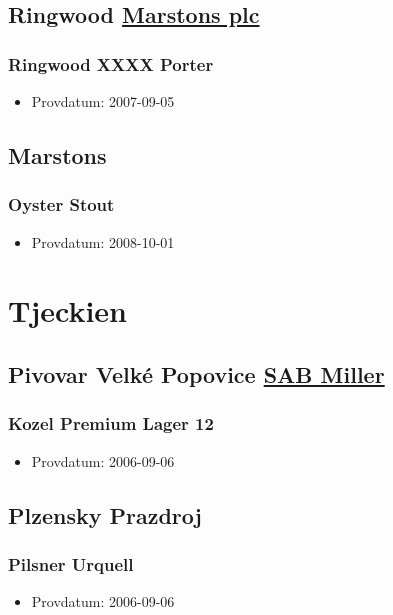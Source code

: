 \documentclass[11pt]{article}
\begin{document}
\subsection{Ringwood \underline{Marstons plc}}
\label{sec:org7ec8406}
\subsubsection{Ringwood XXXX Porter}
\label{sec:org09276bc}
\begin{itemize}
\item Provdatum: 2007-09-05
\end{itemize}
\subsection{Marstons}
\label{sec:org5a6fb86}
\subsubsection{Oyster Stout}
\label{sec:org2e5cd79}
\begin{itemize}
\item Provdatum: 2008-10-01
\end{itemize}
\section{Tjeckien}
\label{sec:orge94d19a}
\subsection{Pivovar Velké Popovice \underline{SAB Miller}}
\label{sec:org55e7d24}
\subsubsection{Kozel Premium Lager 12}
\label{sec:org7e6ea9e}
\begin{itemize}
\item Provdatum: 2006-09-06
\end{itemize}
\subsection{Plzensky Prazdroj}
\label{sec:org062a75c}
\subsubsection{Pilsner Urquell}
\label{sec:orgd787e6a}
\begin{itemize}
\item Provdatum: 2006-09-06
\end{itemize}
\end{document}
